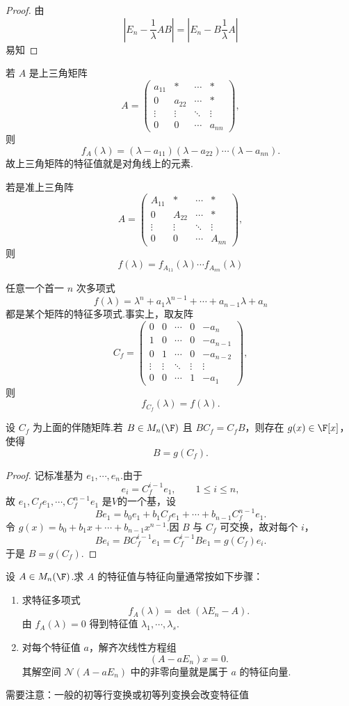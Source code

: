 \begin{proof}
	由\[|E_n - \frac{1}{\lambda}AB| =|E_n - B\frac{1}{\lambda}A|\]易知
\end{proof}


\begin{example}
	若 $A$ 是上三角矩阵
	\[
	A=\begin{pmatrix}
		a_{11}&*&\cdots&*\\
		0&a_{22}&\cdots&*\\
		\vdots&\vdots&\ddots&\vdots\\
		0&0&\cdots&a_{nn}
	\end{pmatrix},
	\]
	则
	\[
	f_A(\lambda)=(\lambda-a_{11})(\lambda-a_{22})\cdots(\lambda-a_{nn}).
	\]
	故上三角矩阵的特征值就是对角线上的元素.
	
	若是准上三角阵
	\[
	A=\begin{pmatrix}
		A_{11}&*&\cdots&*\\
		0&A_{22}&\cdots&*\\
		\vdots&\vdots&\ddots&\vdots\\
		0&0&\cdots&A_{nn}
	\end{pmatrix},
	\]
	则\[f(\lambda) = f_{A_{11}}(\lambda)\cdots f_{A_{nn}}(\lambda)\]
\end{example}

\begin{example}
	任意一个首一 $n$ 次多项式
	\[
	f(\lambda)=\lambda^n+a_1\lambda^{n-1}+\cdots+a_{n-1}\lambda+a_n
	\]
	都是某个矩阵的特征多项式.事实上，取友阵
	\[
	C_f=\begin{pmatrix}
	0&0&\cdots&0&-a_n\\
	1&0&\cdots&0&-a_{n-1}\\
	0&1&\cdots&0&-a_{n-2}\\
	\vdots&\vdots&\ddots&\vdots&\vdots\\
	0&0&\cdots&1&-a_1
\end{pmatrix},
\]
则
\[
f_{C_f}(\lambda)=f(\lambda).
\]
\end{example}

\begin{lemma}
设 $C_f$ 为上面的伴随矩阵.若 $B\in M_n(\F)$ 且 $BC_f=C_fB$，则存在 $g(x)\in\F[x]$，使得
\[
B=g(C_f).
\]
\end{lemma}

\begin{proof}
记标准基为 $e_1,\cdots,e_n$.由于
\[
e_i=C_f^{i-1}e_1,
\qquad 1\leq i\leq n,
\]
故 $e_1,C_f e_1,\cdots,C_f^{n-1} e_1$ 是$V$的一个基，设
\[
Be_1=b_0e_1+b_1C_fe_1+\cdots+b_{n-1}C_f^{n-1}e_1.
\]
令 $g(x)=b_0+b_1x+\cdots+b_{n-1}x^{n-1}$.因 $B$ 与 $C_f$ 可交换，故对每个 $i$，
\[
Be_i=B C_f^{i-1}e_1=C_f^{i-1}Be_1=g(C_f)e_i.
\]
于是 $B=g(C_f)$.
\end{proof}
设 $A\in M_n(\F)$.求 $A$ 的特征值与特征向量通常按如下步骤：
\begin{enumerate}
	\item 求特征多项式
	\[
	f_A(\lambda)=\det(\lambda E_n-A).
	\]
	由 $f_A(\lambda)=0$ 得到特征值 $\lambda_1,\cdots,\lambda_s$.
	\item 对每个特征值 $a$，解齐次线性方程组
	\[
	(A-aE_n)x=0.
	\]
	其解空间 $\mathcal N(A-aE_n)$ 中的非零向量就是属于 $a$ 的特征向量.
\end{enumerate}
需要注意：一般的初等行变换或初等列变换会改变特征值



